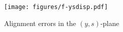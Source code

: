 
\begin{figure}[ht]
	\centering
	\setlength{\unitlength}{1pt}
	\texttt{[image: figures/f-ysdisp.pdf]}
	\caption{Alignment errors in the $(y,s)$-plane}
	\label{F-YSDISP}
\end{figure}

